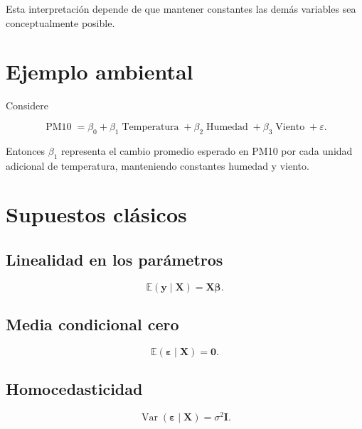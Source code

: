 \documentclass[
  spanish,
  10.5pt,
  letterpaper,
  DIV=11,
  numbers=noendperiod,
  oneside,
  open=any]{scrreprt}
\theoremstyle{definition}
\theoremstyle{definition}
\theoremstyle{plain}
\theoremstyle{remark}
\begin{document}
Esta interpretación depende de que mantener constantes las demás
variables sea conceptualmente posible.

\section*{Ejemplo ambiental}\label{ejemplo-ambiental}


Considere

\[
\operatorname{PM10}
=
\beta_0
+
\beta_1\operatorname{Temperatura}
+
\beta_2\operatorname{Humedad}
+
\beta_3\operatorname{Viento}
+
\varepsilon.
\]

Entonces \(\beta_1\) representa el cambio promedio esperado en PM10 por
cada unidad adicional de temperatura, manteniendo constantes humedad y
viento.

\section*{Supuestos clásicos}\label{supuestos-cluxe1sicos-1}


\subsection*{Linealidad en los
parámetros}\label{linealidad-en-los-paruxe1metros}

\[
\mathbb{E}(\mathbf{y}\mid\mathbf{X})
=
\mathbf{X}\boldsymbol{\beta}.
\]

\subsection*{Media condicional cero}\label{media-condicional-cero}

\[
\mathbb{E}(\boldsymbol{\varepsilon}\mid\mathbf{X})
=
\mathbf{0}.
\]

\subsection*{Homocedasticidad}\label{homocedasticidad}

\[
\operatorname{Var}(\boldsymbol{\varepsilon}\mid\mathbf{X})
=
\sigma^2\mathbf{I}.
\]
\end{document}
